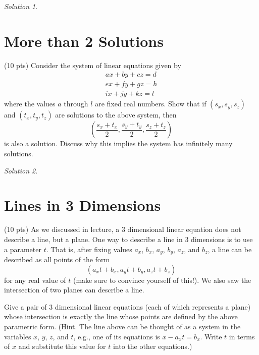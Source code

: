 \documentclass{article}
\theoremstyle{remark}
\newtheorem*{solution}{Solution}
\begin{document}
\begin{solution}
\end{solution}

\pagebreak
\section{More than 2 Solutions}

(10 pts) Consider the system of linear equations given by
\begin{align*}
  ax + by + cz = d \\
  ex + fy + gz = h \\
  ix + jy + kz = l
\end{align*}
where the values $a$ through $l$ are fixed real numbers.
Show that if $(s_x, s_y, s_z)$ and $(t_x, t_y, t_z)$ are solutions to the above system, then
\begin{displaymath}
  \left(\frac{s_x + t_x}{2}, \frac{s_y + t_y}{2}, \frac{s_z + t_z}{2} \right)
\end{displaymath}
is also a solution.
Discuss why this implies the system has infinitely many solutions.

\begin{solution}
\end{solution}

\pagebreak
\section{Lines in 3 Dimensions}

(10 pts) As we discussed in lecture, a 3 dimensional linear equation does not describe a line, but a plane.
One way to describe a line in 3 dimensions is to use a parameter $t$.
That is, after fixing values $a_x$, $b_x$, $a_y$, $b_y$, $a_z$, and $b_z$, a line can be described as all points of the form
\begin{displaymath}
  (a_xt + b_x, a_yt + b_y, a_zt + b_z)
\end{displaymath}
for any real value of $t$ (make sure to convince yourself of this!).
We also saw the intersection of two planes can describe a line.

Give a pair of 3 dimensional linear equations (each of which represents a plane) whose intersection is exactly the line whose points are defined by the above parametric form. (Hint. The line above can be thought of as a system in the variables $x$, $y$, $z$, and $t$, e.g., one of its equations is $x - a_xt = b_x$. Write $t$ in terms of $x$ and substitute this value for $t$ into the other equations.)
\end{document}
